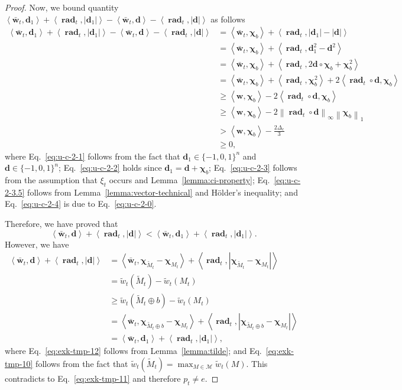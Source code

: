\documentclass{article}
\newcommand{\M}{\mathcal M}
\DeclareMathOperator{\rad}{rad}
\newcommand{\inn}[1]{\left\langle #1 \right\rangle}
\newcommand{\nor}[1]{\left\|#1\right\|}
\renewcommand{\vec}[1]{\boldsymbol{#1}}
\renewcommand{\odot}{\circ}
\begin{document}
\begin{proof}
Now, we bound quantity $\inn{\vec {\bar w}_t, \vec d_1}+\inn{\vec \rad_t, |\vec d_1|}
-\inn{\vec {\bar w}_t, \vec d}-\inn{\vec \rad_t,  |\vec d|}$ as follows
\begin{align}
\inn{\vec {\bar w}_t, \vec d_1}+\inn{\vec \rad_t, |\vec d_1|}
-\inn{\vec {\bar w}_t, \vec d}-\inn{\vec \rad_t,  |\vec d|}
& = \inn{\vec {\bar w}_t, \vec \chi_b} + \inn{\vec \rad_t, |\vec d_1|-|\vec d|} \nonumber\\
& =	\inn{\vec {\bar w}_t, \vec \chi_b} + \inn{\vec \rad_t, \vec d_1^2-\vec d^2} \label{eq:u-c-2-1} \\
& =	\inn{\vec {\bar w}_t, \vec \chi_b} + \inn{\vec \rad_t, 2\vec d\odot \vec \chi_b +\vec \chi_b^2} \label{eq:u-c-2-2} \\
& =	\inn{\vec {\bar w}_t, \vec \chi_b} + \inn{\vec \rad_t, \vec\chi_b^2} + 2\inn{\vec \rad_t\odot \vec d, \vec \chi_b} \nonumber \\
& \ge \inn{\vec w, \vec \chi_b}- 2\inn{\vec \rad_t\odot \vec d, \vec \chi_b}  \label{eq:u-c-2-3} \\
& \ge \inn{\vec w, \vec \chi_b}-2\nor{\vec \rad_t\odot \vec d}_\infty\nor{\vec\chi_b}_1 \label{eq:u-c-2-3.5} \\
& > \inn{\vec w, \vec \chi_b}-\frac{2\Delta_e}{3} \label{eq:u-c-2-4} \\
& \ge 0 \label{eq:u-c-2-5},
\end{align}
where Eq.~\eqref{eq:u-c-2-1} follows from the fact that $\vec d_1\in \{-1,0,1\}^n$ and $\vec d \in \{-1,0,1\}^n$;
Eq.~\eqref{eq:u-c-2-2} holds since $\vec d_1=\vec d+\vec \chi_b$;
Eq.~\eqref{eq:u-c-2-3} follows from the assumption that $\xi_t$ occurs and Lemma~\ref{lemma:ci-property};
Eq.~\eqref{eq:u-c-2-3.5} follows from Lemma~\ref{lemma:vector-technical}  and H\"older's inequality;
and Eq.~\eqref{eq:u-c-2-4} is due to Eq.~\eqref{eq:u-c-2-0}.

Therefore, we have proved that 
\begin{equation}
\label{eq:exk-tmp-11}
\inn{\vec {\bar w}_t, \vec d}+\inn{\vec \rad_t,  |\vec d|} < \inn{\vec {\bar w}_t, \vec d_1}+\inn{\vec \rad_t, |\vec d_1|}.
\end{equation}
However, we have
\begin{align}
\inn{\vec {\bar w}_t, \vec d}+\inn{\vec \rad_t,  |\vec d|} 
&= \inn{\vec {\bar w}_t, \vec \chi_{\tilde M_t} - \vec \chi_{M_t}}+\inn{\vec \rad_t,  |\vec \chi_{\tilde M_t} - \vec \chi_{M_t}|}\label{eq:exk-tmp-12}\\
&= \tilde w_t(\tilde M_t) - \tilde w_t(M_t)\nonumber\\
& \ge \tilde w_t(\tilde M_t \oplus b)-\tilde w_t(M_t)\label{eq:exk-tmp-10}\\
&= \inn{\vec {\bar w}_t, \vec \chi_{\tilde M_t \oplus b} - \vec \chi_{M_t}}+\inn{\vec \rad_t,  |\vec \chi_{\tilde M_t \oplus b} - \vec \chi_{M_t}|}\nonumber\\
&= \inn{\vec {\bar w}_t, \vec d_1}+\inn{\vec \rad_t,  |\vec d_1|},
\end{align}
where Eq.~\eqref{eq:exk-tmp-12} follows from Lemma~\ref{lemma:tilde}; and Eq.~\eqref{eq:exk-tmp-10} follows from the fact that $\tilde w_t(\tilde M_t) = \max_{M\in \M} \tilde w_t(M)$.
This contradicts to Eq.~\eqref{eq:exk-tmp-11} and therefore $p_t\not= e$.


\end{proof}
\end{document}
